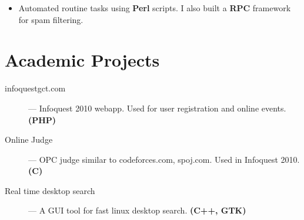 \documentclass{resume}
\begin{document}
\begin{itemize} \itemsep1pt \parskip0pt
  \item Automated routine tasks using \textbf{Perl} scripts.  I also built a \textbf{RPC} framework for spam filtering.
\end{itemize}
 
\section{Academic Projects}
\begin{description}
  \item[infoquestgct.com] --- Infoquest 2010 webapp.  Used for user registration and online events. \textbf{(PHP)}
  \item[Online Judge] --- OPC judge similar to codeforces.com, spoj.com.  Used in Infoquest 2010. \textbf{(C)}
  \item[Real time desktop search] --- A GUI tool for fast linux desktop search.  \textbf{(C++, GTK)}
\end{description}
\end{document}
